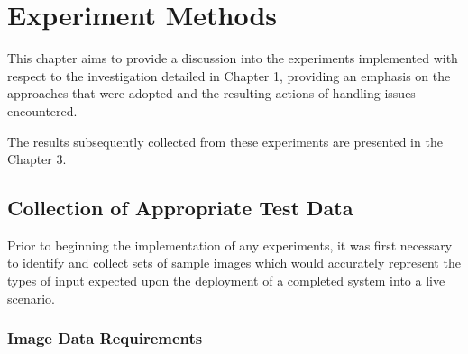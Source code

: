 \chapter{Experiment Methods}
%
%
%
%

This chapter aims to provide a discussion into the experiments implemented with respect to the investigation detailed in Chapter 1, providing an emphasis on the approaches that were adopted and the resulting actions of handling issues encountered.

The results subsequently collected from these experiments are presented in the Chapter 3.

\section{Collection of Appropriate Test Data}

Prior to beginning the implementation of any experiments, it was first necessary to identify and collect sets of sample images which would accurately represent the types of input expected upon the deployment of a completed system into a live scenario. 

\subsection{Image Data Requirements}

